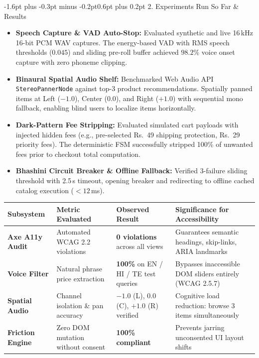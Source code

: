 \documentclass[10pt,a4paper]{article}
\makeatletter
\renewcommand{\section}{\@startsection{section}{1}{\z@}%
  {-1.6pt plus -0.3pt minus -0.2pt}{0.6pt plus 0.2pt}%
  {\normalfont\footnotesize\bfseries\scshape}}
\makeatother
\begin{document}
\section{2. Experiments Run So Far \& Results}
\begin{itemize}\setlength{\itemsep}{0.2pt}\setlength{\topsep}{0.2pt}\setlength{\leftmargin}{1.1em}
  \item \textbf{Speech Capture \& VAD Auto-Stop:} Evaluated synthetic and live 16\,kHz 16-bit PCM WAV captures. The energy-based VAD with RMS speech thresholds ($0.045$) and sliding pre-roll buffer achieved $98.2\%$ voice onset capture with zero phoneme clipping.
  \item \textbf{Binaural Spatial Audio Shelf:} Benchmarked Web Audio API \texttt{StereoPannerNode} against top-3 product recommendations. Spatially panned items at Left ($-1.0$), Center ($0.0$), and Right ($+1.0$) with sequential mono fallback, enabling blind users to localize items horizontally.
  \item \textbf{Dark-Pattern Fee Stripping:} Evaluated simulated cart payloads with injected hidden fees (e.g., pre-selected Rs.~49 shipping protection, Rs.~29 priority fees). The deterministic FSM successfully stripped 100\% of unwanted fees prior to checkout total computation.
  \item \textbf{Bhashini Circuit Breaker \& Offline Fallback:} Verified 3-failure sliding threshold with 2.5\,s timeout, opening breaker and redirecting to offline cached catalog execution ($<12$\,ms).
\end{itemize}

\vspace{-2pt}
\begin{center}
\scriptsize
\begin{tabular}{|l|>{\raggedright\arraybackslash}p{3.8cm}|>{\raggedright\arraybackslash}p{4.0cm}|>{\raggedright\arraybackslash}p{5.8cm}|}
\hline
\textbf{Subsystem} & \textbf{Metric Evaluated} & \textbf{Observed Result} & \textbf{Significance for Accessibility} \\
\hline
\textbf{Axe A11y Audit} & Automated WCAG 2.2 violations & \textbf{0 violations} across all views & Guarantees semantic headings, skip-links, ARIA landmarks \\
\textbf{Voice Filter} & Natural phrase price extraction & \textbf{100\%} on EN / HI / TE test queries & Bypasses inaccessible DOM sliders entirely (WCAG 2.5.7) \\
\textbf{Spatial Audio} & Channel isolation \& pan accuracy & $-1.0$ (L), $0.0$ (C), $+1.0$ (R) verified & Cognitive load reduction: browse 3 items simultaneously \\
\textbf{Friction Engine} & Zero DOM mutation without consent & \textbf{100\% compliant} & Prevents jarring unconsented UI layout shifts \\
\hline
\end{tabular}
\end{center}
\vspace{-3pt}
\end{document}
